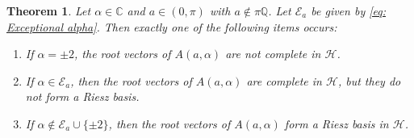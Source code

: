 \documentclass[11pt, a4paper,reqno]{amsart}
\theoremstyle{plain}
\newtheorem{theorem}{{Theorem}}[section]
\theoremstyle{definition}
\theoremstyle{remark}
\newcommand{\1}{\mathds 1}
\begin{document}
\begin{theorem}\label{T: Irrational Riesz criterion}
    Let $\alpha \in \mathbb C$ and $a \in (0,\pi)$ with $a \notin \pi \mathbb Q$. Let $\mathcal E_a$ be given by \eqref{eq: Exceptional alpha}. Then exactly one of the following items occurs:
    \begin{enumerate}
        \item If $\alpha = \pm 2$, the root vectors of $A(a,\alpha)$ are not complete in $\mathcal H$.
        \item If $\alpha \in \mathcal E_a$, then the root vectors of $A(a, \alpha)$ are complete in $\mathcal H$, but they do not form a Riesz basis.
        \item If $\alpha \notin \mathcal E_a \cup \{\pm 2\}$, then the root vectors of $A(a, \alpha)$ form a Riesz basis in $\mathcal H$.
    \end{enumerate}
\end{theorem}
\end{document}
